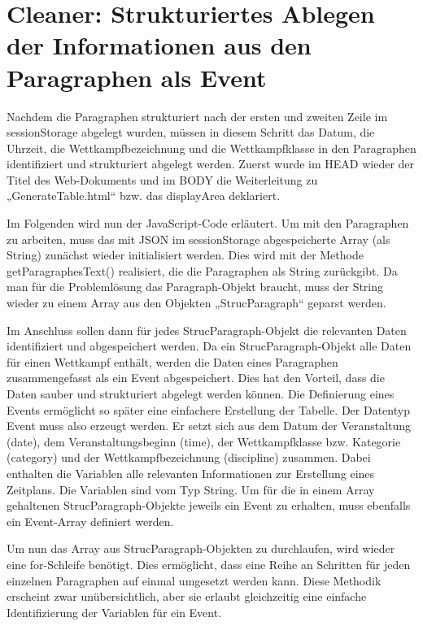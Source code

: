 {\section{Cleaner: Strukturiertes Ablegen der Informationen aus den Paragraphen als Event}

Nachdem die Paragraphen strukturiert nach der ersten und zweiten Zeile im sessionStorage abgelegt wurden, müssen in diesem Schritt das Datum, die Uhrzeit, die Wettkampfbezeichnung und die Wettkampfklasse in den Paragraphen identifiziert und strukturiert abgelegt werden. 
Zuerst wurde im HEAD wieder der Titel des Web-Dokuments und im BODY die Weiterleitung zu „GenerateTable.html“ bzw. das displayArea deklariert.

Im Folgenden wird nun der JavaScript-Code erläutert. Um mit den Paragraphen zu arbeiten, muss das mit JSON im sessionStorage abgespeicherte Array (als String) zunächst wieder initialisiert werden. Dies wird mit der Methode getParagraphesText() realisiert, die die Paragraphen als String zurückgibt. Da man für die Problemlösung das Paragraph-Objekt braucht, muss der String wieder zu einem Array aus den Objekten „StrucParagraph“ geparst werden.

Im Anschluss sollen dann für jedes StrucParagraph-Objekt die relevanten Daten identifiziert und abgespeichert werden. Da ein StrucParagraph-Objekt alle Daten für einen Wettkampf enthält, werden die Daten eines Paragraphen zusammengefasst als ein Event abgespeichert. Dies hat den Vorteil, dass die Daten sauber und strukturiert abgelegt werden können. Die Definierung eines Events ermöglicht so später eine einfachere Erstellung der Tabelle. Der Datentyp Event muss also erzeugt werden. Er setzt sich aus dem Datum der Veranstaltung (date), dem Veranstaltungsbeginn (time), der Wettkampfklasse bzw. Kategorie (category) und der Wettkampfbezeichnung (discipline) zusammen. Dabei enthalten die Variablen alle relevanten Informationen zur Erstellung eines Zeitplans. Die Variablen sind vom Typ String. Um für die in einem Array gehaltenen StrucParagraph-Objekte jeweils ein Event zu erhalten, muss ebenfalls ein Event-Array definiert werden.

Um nun das Array aus StrucParagraph-Objekten zu durchlaufen, wird wieder eine for-Schleife benötigt. Dies ermöglicht, dass eine Reihe an Schritten für jeden einzelnen Paragraphen auf einmal umgesetzt werden kann. Diese Methodik erscheint zwar unübersichtlich, aber sie erlaubt gleichzeitig eine einfache Identifizierung der Variablen für ein Event.

}
